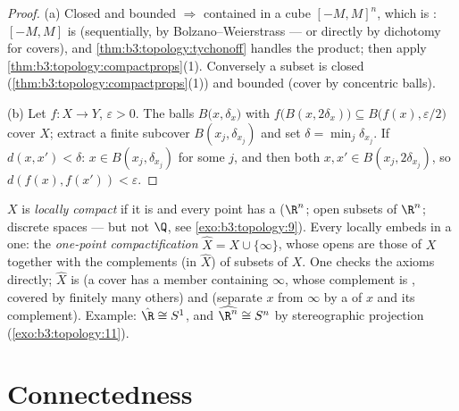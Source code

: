 \begin{proof}
(a) Closed and bounded $\Rightarrow$ contained in a cube
$[-M,M]^n$, which is : $[-M, M]$ is (sequentially, by
Bolzano--Weierstrass --- or directly by dichotomy for covers),
and \cref{thm:b3:topology:tychonoff} handles the product; then
apply \cref{thm:b3:topology:compactprops}(1). Conversely a
 subset is closed
(\cref{thm:b3:topology:compactprops}(1)) and bounded (cover by
concentric balls).

(b) Let $f \colon X \to Y$, $\varepsilon > 0$. The balls
$B\bigl(x, \delta_x\bigr)$ with $f\bigl(B(x,
2\delta_x)\bigr)\subseteq B\bigl(f(x), \varepsilon/2\bigr)$
cover $X$; extract a finite subcover $B(x_j, \delta_{x_j})$ and
set $\delta = \min_j \delta_{x_j}$. If $d(x, x') < \delta$: $x
\in B(x_j, \delta_{x_j})$ for some $j$, and then both $x, x'
\in B(x_j, 2\delta_{x_j})$, so $d(f(x), f(x')) < \varepsilon$.
\end{proof}

\begin{definition}\label{def:b3:topology:locallycompact}
$X$ is \emph{locally compact} if it
is  and every point has a   ($\R^n$;
open subsets of $\R^n$; discrete spaces --- but not $\Q$, see
\cref{exo:b3:topology:9}). Every locally  embeds in
a  one: the \emph{one-point
compactification} $\hat X = X
\cup \{\infty\}$, whose opens are those of $X$ together with the
complements (in $\hat X$) of  subsets of $X$. One checks
the axioms directly; $\hat X$ is  (a cover has a member
containing $\infty$, whose complement is , covered by
finitely many others) and  (separate $x$ from $\infty$
by a   of $x$ and its complement). Example:
$\hat\R \cong S^1$, and $\widehat{\R^n} \cong S^n$ by
stereographic projection (\cref{exo:b3:topology:11}).
\end{definition}

\section{Connectedness}

